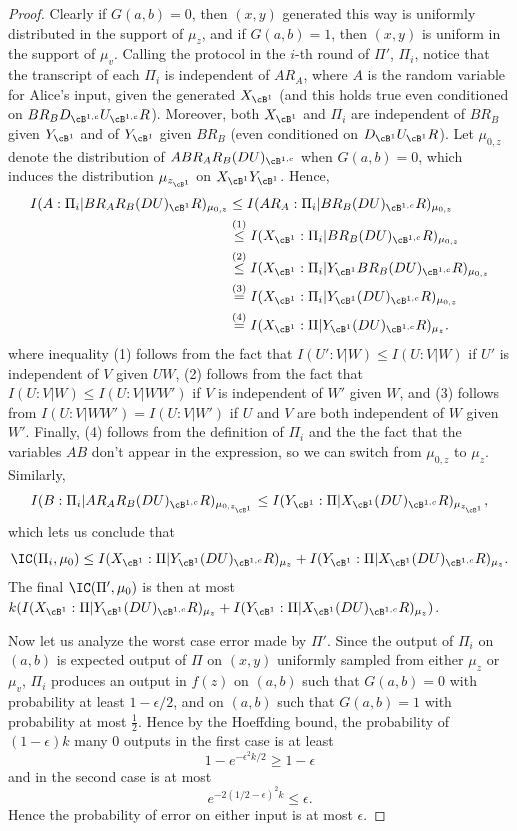 \begin{proof}
Clearly if $G(a,b)=0$, then $(x,y)$ generated this way is uniformly distributed in the support of $\mu_z$, and if $G(a,b)=1$, then $(x,y)$ is uniform in the support of $\mu_v$. Calling the protocol in the $i$-th round of $\Pi'$, $\Pi_i$, notice that the transcript of each $\Pi_i$ is independent of $AR_A$, where $A$ is the random variable for Alice's input, given the generated $X_{\cB^1}$ (and this holds true even conditioned on $BR_BD_{\cB^{1,c}}U_{\cB^{1,c}}R$). Moreover, both $X_{\cB^1}$ and $\Pi_i$ are independent of $BR_B$ given $Y_{\cB^1}$ and of $Y_{\cB^1}$ given $BR_B$ (even conditioned on $D_{\cB^1}U_{\cB^1}R$). Let $\mu_{0,z}$ denote the distribution of $ABR_AR_B(DU)_{\cB^{1,c}}$ when $G(a,b)=0$, which induces the distribution $\mu_{z_{\cB^1}}$ on $X_{\cB^1}Y_{\cB^1}$. Hence,
\begin{align*}
I(A:\Pi_i|BR_AR_B(DU)_{\cB^1}R)_{\mu_{0,z}} & \leq I(AR_A:\Pi_i|BR_B(DU)_{\cB^{1,c}}R)_{\mu_{0,z}} \\
 & \overset{(1)}{\leq} I(X_{\cB^1}:\Pi_i|BR_B(DU)_{\cB^{1,c}}R)_{\mu_{0,z}} \\
 & \overset{(2)}{\leq} I(X_{\cB^1}:\Pi_i|Y_{\cB^1}BR_B(DU)_{\cB^{1,c}}R)_{\mu_{0,z}} \\
 & \overset{(3)}{=} I(X_{\cB^1}:\Pi_i|Y_{\cB^1}(DU)_{\cB^{1,c}}R)_{\mu_{0,z}} \\
 & \overset{(4)}{=} I(X_{\cB^1}:\Pi|Y_{\cB^1}(DU)_{\cB^{1,c}}R)_{\mu_z}.
\end{align*}
where inequality (1) follows from the fact that $I(U':V|W) \leq I(U:V|W)$ if $U'$ is independent of $V$ given $UW$, (2) follows from the fact that $I(U:V|W) \leq I(U:V|WW')$ if $V$ is independent of $W'$ given $W$, and (3) follows from $I(U:V|WW')=I(U:V|W')$ if $U$ and $V$ are both independent of $W$ given $W'$. Finally, (4) follows from the definition of $\Pi_i$ and the the fact that the variables $AB$ don't appear in the expression, so we can switch from $\mu_{0,z}$ to $\mu_z$. Similarly,
\[ I(B:\Pi_i|AR_AR_B(DU)_{\cB^{1,c}}R)_{\mu_{0,z_{\cB^1}}} \leq I(Y_{\cB^1}:\Pi|X_{\cB^1}(DU)_{\cB^{1,c}}R)_{\mu_{z_{\cB^1}}},\]
which lets us conclude that
\[\IC(\Pi_i,\mu_0) \leq I(X_{\cB^1}:\Pi|Y_{\cB^1}(DU)_{\cB^{1,c}}R)_{\mu_z} + I(Y_{\cB^1}:\Pi|X_{\cB^1}(DU)_{\cB^{1,c}}R)_{\mu_z}.\]
The final $\IC(\Pi',\mu_0)$ is then at most $k(I(X_{\cB^1}:\Pi|Y_{\cB^1}(DU)_{\cB^{1,c}}R)_{\mu_z} + I(Y_{\cB^1}:\Pi|X_{\cB^1}(DU)_{\cB^{1,c}}R)_{\mu_z})$.

Now let us analyze the worst case error made by $\Pi'$. Since the output of $\Pi_i$ on $(a,b)$ is expected output of $\Pi$ on $(x,y)$ uniformly sampled from either $\mu_z$ or $\mu_v$, $\Pi_i$ produces an output in $f(z)$ on $(a,b)$ such that $G(a,b)=0$ with probability at least $1-\epsilon/2$, and on $(a,b)$ such that $G(a,b)=1$ with probability at most $\frac{1}{2}$. Hence by the Hoeffding bound, the probability of $(1-\epsilon)k$ many 0 outputs in the first case is at least
\[ 1-e^{-\epsilon^2k/2} \geq 1- \epsilon\]
and in the second case is at most
\[ e^{-2(1/2-\epsilon)^2k} \leq \epsilon.\]
Hence the probability of error on either input is at most $\epsilon$.
\end{proof}
